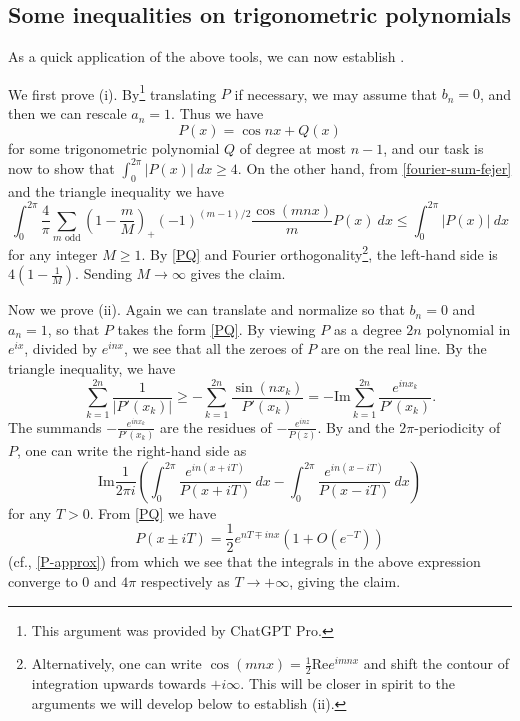 \documentclass[12pt]{amsart}
\renewcommand{\Im}{\mathrm{Im}}
\begin{document}
\subsection{Some inequalities on trigonometric polynomials}\label{trig-sec}

As a quick application of the above tools, we can now establish .

We first prove (i).  By\footnote{This argument was provided by ChatGPT Pro.} translating $P$ if necessary, we may assume that $b_n=0$, and then we can rescale $a_n=1$.  Thus we have
\begin{equation}\label{PQ}
    P(x) = \cos nx + Q(x)
\end{equation}
for some trigonometric polynomial $Q$ of degree at most $n-1$, and our task is now to show that $\int_0^{2\pi} |P(x)|\ dx \geq 4$.  On the other hand, from \eqref{fourier-sum-fejer} and the triangle inequality we have
$$ \int_0^{2\pi} \frac{4}{\pi} \sum_{m \text{ odd}} \left(1-\frac{m}{M}\right)_+ (-1)^{(m-1)/2} \frac{\cos(mnx)}{m} P(x)\ dx \leq \int_0^{2\pi} |P(x)|\ dx$$
for any integer $M \geq 1$.  By \eqref{PQ} and Fourier orthogonality\footnote{Alternatively, one can write $\cos(mnx) = \frac{1}{2} \mathrm{Re} e^{imnx}$ and shift the contour of integration upwards towards $+i\infty$.  This will be closer in spirit to the arguments we will develop below to establish (ii).}, the left-hand side is $4(1-\frac{1}{M})$.  Sending $M \to \infty$ gives the claim.

Now we prove (ii).  Again we can translate and normalize so that $b_n=0$ and $a_n=1$, so that $P$ takes the form \eqref{PQ}. By viewing $P$ as a degree $2n$ polynomial in $e^{ix}$, divided by $e^{inx}$, we see that all the zeroes of $P$ are on the real line. By the triangle inequality, we have
$$ \sum_{k=1}^{2n} \frac{1}{|P'(x_k)|} \geq -\sum_{k=1}^{2n} \frac{\sin(nx_k)}{P'(x_k)}  = -\Im \sum_{k=1}^{2n} \frac{e^{inx_k}}{P'(x_k)} .$$
The summands $-\frac{e^{inx_k}}{P'(x_k)}$ are the residues of $-\frac{e^{inz}}{P(z)}$.  By  and the $2\pi$-periodicity of $P$, one can write the right-hand side as
$$\Im \frac{1}{2\pi i} \left( \int_0^{2\pi} \frac{e^{in(x+iT)}}{P(x+iT)}\ dx - \int_0^{2\pi} \frac{e^{in(x-iT)}}{P(x-iT)}\ dx \right)$$
for any $T>0$.  From \eqref{PQ} we have
$$ P(x \pm iT) = \frac{1}{2} e^{nT \mp inx} (1 + O( e^{-T} ))$$
(cf., \eqref{P-approx}) from which we see that the integrals in the above expression converge to $0$ and $4\pi$ respectively as $T \to +\infty$, giving the claim.
\end{document}
